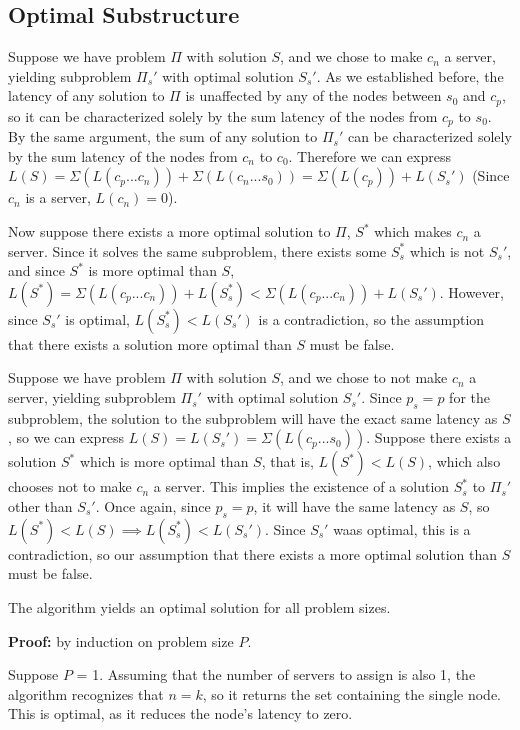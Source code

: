 \documentclass[11pt]{article}
\begin{document}
\subsection*{Optimal Substructure}

Suppose we have problem $\Pi$ with solution $S$, and we chose to make $c_n$ a server, yielding subproblem $\Pi_s'$ with optimal solution $S_s'$. As we established before, the latency of any solution to $\Pi$ is unaffected by any of the nodes between $s_0$ and $c_p$, so it can be characterized solely by the sum latency of the nodes from $c_p$ to $s_0$. By the same argument, the sum of any solution to $\Pi_s'$ can be characterized solely by the sum latency of the nodes from $c_n$ to $c_0$. Therefore we can express $L(S) = \Sigma (L(c_p ... c_n)) + \Sigma (L(c_n ... s_0)) = \Sigma(L(c_p)) + L(S_s')$ (Since $c_n$ is a server, $L(c_n) = 0$). 

Now suppose there exists a more optimal solution to $\Pi$, $S^*$ which makes $c_n$ a server. Since it solves the same subproblem, there exists some $S_s^*$ which is not $S_s'$, and since $S^*$ is more optimal than $S$, $L(S^*) = \Sigma (L(c_p ... c_n)) + L(S_s^*) < \Sigma(L(c_p ... c_n)) + L(S_s')$. However, since $S_s'$ is optimal, $L(S_s^*) < L(S_s')$ is a contradiction, so the assumption that there exists a solution more optimal than $S$ must be false.

Suppose we have problem $\Pi$ with solution $S$, and we chose to not make $c_n$ a server, yielding subproblem $\Pi_s'$ with optimal solution $S_s'$. Since $p_s = p$ for the subproblem, the solution to the subproblem will have the exact same latency as $S$, so we can express $L(S) = L(S_s') = \Sigma(L(c_p ... s_0))$. Suppose there exists a solution $S^*$ which is more optimal than $S$, that is, $L(S^*) < L(S)$, which also chooses not to make $c_n$ a server. This implies the existence of a solution $S_s^*$ to $\Pi_s'$ other than $S_s'$. Once again, since $p_s = p$, it will have the same latency as $S$, so $L(S^*) < L(S) \implies L(S_s^*) < L(S_s')$. Since $S_s'$ waas optimal, this is a contradiction, so our assumption that there exists a more optimal solution than $S$ must be false.

The algorithm yields an optimal solution for all problem sizes. 

\textbf{Proof: } by induction on problem size $P$. 

Suppose $P$ = 1. Assuming that the number of servers to assign is also 1, the algorithm recognizes that $n = k$, so it returns the set containing the single node. This is optimal, as it reduces the node's latency to zero.
\end{document}
